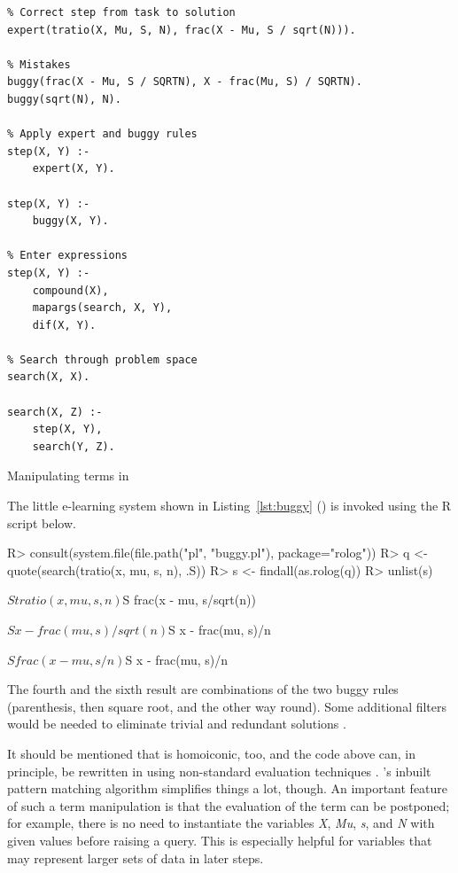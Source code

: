 \documentclass[article]{jss}
\begin{document}
\begin{listing}[ht]
\begin{verbatim}
% Correct step from task to solution
expert(tratio(X, Mu, S, N), frac(X - Mu, S / sqrt(N))).

% Mistakes
buggy(frac(X - Mu, S / SQRTN), X - frac(Mu, S) / SQRTN).
buggy(sqrt(N), N).

% Apply expert and buggy rules
step(X, Y) :-
    expert(X, Y).

step(X, Y) :-
    buggy(X, Y).

% Enter expressions
step(X, Y) :-
    compound(X),
    mapargs(search, X, Y),
    dif(X, Y).

% Search through problem space
search(X, X).

search(X, Z) :-
    step(X, Y),
    search(Y, Z).
\end{verbatim}
\caption[Manipulating terms in Prolog]{Manipulating terms in }
\label{lst:buggy}
\end{listing}

The little e-learning system shown in Listing~\ref{lst:buggy} ()
is invoked using the R script below.

\begin{Schunk}
\begin{Sinput}
R> consult(system.file(file.path("pl", "buggy.pl"), package="rolog"))
R> q <- quote(search(tratio(x, mu, s, n), .S))
R> s <- findall(as.rolog(q))
R> unlist(s)
\end{Sinput}
\begin{Soutput}
$S
tratio(x, mu, s, n)

$S
frac(x - mu, s/sqrt(n))

$S
x - frac(mu, s)/sqrt(n)

$S
x - frac(mu, s)/n

$S
frac(x - mu, s/n)

$S
x - frac(mu, s)/n
\end{Soutput}
\end{Schunk}

The fourth and the sixth result are combinations of the two buggy 
rules (parenthesis, then square root, and the other way round). Some additional
filters would be needed to eliminate trivial and redundant solutions 
\citep[see, e.g., the chapter on generate-and-test in][]{Sterling1994}.

It should be mentioned that  is homoiconic, too, and 
the  code above can, in principle, be rewritten in 
using non-standard evaluation
techniques \citep{Wickham2019}. 's inbuilt pattern matching
algorithm simplifies things a lot, though. An important feature of such a term 
manipulation is that the evaluation of the term can be postponed; for example, 
there is no need to instantiate the variables \emph{X}, \emph{Mu}, \emph{s},
and \emph{N} with given values before raising a query. This is especially
helpful for variables that may represent larger sets of data in later steps.
\end{document}
